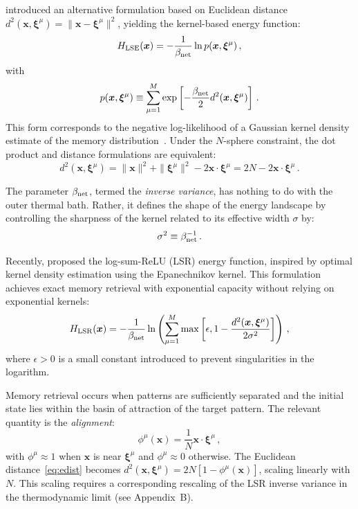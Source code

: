 \documentclass{article}
\theoremstyle{plain}
\theoremstyle{definition}
\theoremstyle{remark}
\begin{document}
\citet{krotov2021large} introduced an alternative formulation based on Euclidean distance $d^2(\bm{x}, \bm{\xi}^\mu) = \|\bm{x}-\bm{\xi}^\mu\|^2$, yielding the kernel-based energy function:
\begin{equation}
    H_{\rm LSE}(\bm{x}) = -\frac{1}{\beta_{\rm net}} \ln p(\bm{x}, \bm{\xi}^\mu) \,,
    \label{eq:H_lse}
\end{equation}
with 
\begin{equation}
    p(\bm{x}, \bm{\xi}^\mu) \equiv \sum_{\mu=1}^M \exp\left[ - \frac{\beta_{\rm net}}{2} d^2(\bm{x}, \bm{\xi}^\mu) \right] \,.
    \label{eq:dens}
\end{equation}
This form corresponds to the negative log-likelihood of a Gaussian kernel density estimate of the memory distribution~\citep{hoover2025dense}. Under the $N$-sphere constraint, the dot product and distance formulations are equivalent:
\begin{equation}
    d^2(\bm{x}, \bm{\xi}^\mu) = \|\bm{x}\|^2 + \|\bm{\xi}^\mu\|^2 - 2\bm{x} \cdot \bm{\xi}^\mu = 2N - 2\bm{x} \cdot \bm{\xi}^\mu \,.
    \label{eq:edist}
\end{equation}

The parameter $\beta_{\rm net}$, termed the {\it inverse variance}, has nothing to do with the outer thermal bath. Rather, it defines the shape of the energy landscape by controlling the sharpness of the kernel related to its effective width $\sigma$ by:
\begin{equation}
    \sigma^2 \equiv \beta_{\rm net}^{-1} \,.
\end{equation}

Recently, \citet{hoover2025dense} proposed the log-sum-ReLU (LSR) energy function, inspired by optimal kernel density estimation using the Epanechnikov kernel. This formulation achieves exact memory retrieval with exponential capacity without relying on exponential kernels:
\begin{equation}
    H_{\rm LSR}(\bm{x}) = -\frac{1}{\beta_{\rm net}} \ln \left( \sum_{\mu=1}^M \max\left[\epsilon,  1 - \frac{d^2(\bm{x},\bm{\xi}^\mu)}{2\sigma^2} \right] \right) \,,
    \label{eq:H_lsr}
\end{equation}
where $\epsilon > 0$ is a small constant introduced to prevent singularities in the logarithm.

Memory retrieval occurs when patterns are sufficiently separated and the initial state lies within the basin of attraction of the target pattern. The relevant quantity is the \textit{alignment}:
\begin{equation}
    \phi^\mu(\bm{x}) = \frac{1}{N} \bm{x} \cdot \bm{\xi}^\mu\,,
    \label{eq:alignment}
\end{equation}
with $\phi^\mu \approx 1$ when $\bm{x}$ is near $\bm{\xi}^\mu$ and $\phi^\mu \approx 0$ otherwise. The Euclidean distance~\eqref{eq:edist} becomes $d^2(\bm{x}, \bm{\xi}^\mu) = 2N[1 - \phi^\mu(\bm{x})]$, scaling linearly with $N$. This scaling requires a corresponding rescaling of the LSR inverse variance in the thermodynamic limit (see Appendix~B).
\end{document}
